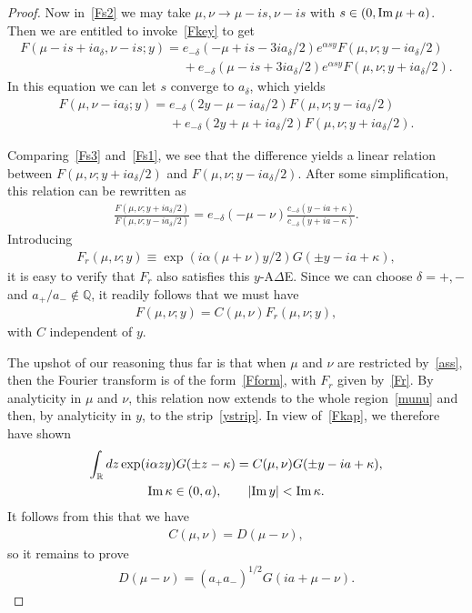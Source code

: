 \documentclass[11pt]{article}
\numberwithin{equation}{section}
\newcommand{\De}{\Delta}
\newcommand{\de}{\delta}
\newcommand{\R}{{\mathbb R}}
\newcommand{\Q}{{\mathbb Q}}
\newcommand{\im}{{\rm Im}\, }
\begin{document}
\begin{proof}
Now in~\eqref{Fs2} we may take $\mu,\nu\to \mu-is,\nu-is$ with $s\in(0,\im\mu +a)$. Then we are entitled to invoke~\eqref{Fkey} to get
\begin{gather}
F(\mu-is+ia_{\de},\nu-is;y)     =     e_{-\de}(-\mu+is-3ia_{\de}/2)e^{\alpha sy}F(\mu,\nu;y-ia_{\de}/2)
\nonumber \\
\phantom{F(\mu-is+ia_{\de},\nu-is;y)     =}{}   +e_{-\de}(\mu-is+3ia_{\de}/2)e^{\alpha sy}F(\mu,\nu;y+ia_{\de}/2).
\end{gather}
In this equation we can let $s$ converge to $a_{\de}$, which yields
\begin{gather}
F(\mu,\nu-ia_{\de};y)     =     e_{-\de}(2y-\mu-ia_{\de}/2)F(\mu,\nu;y-ia_{\de}/2)
\nonumber \\
\phantom{F(\mu,\nu-ia_{\de};y)     =}{}  +e_{-\de}(2y+\mu+ia_{\de}/2)F(\mu,\nu;y+ia_{\de}/2).\label{Fs3}
\end{gather}

Comparing~\eqref{Fs3} and~\eqref{Fs1}, we see that the dif\/ference yields a linear relation between $F(\mu,\nu;y+ia_{\de}/2)$ and $F(\mu,\nu;y-ia_{\de}/2)$. After some simplif\/ication, this relation can be rewritten as
\begin{gather}\label{Fade}
\frac{F(\mu,\nu;y+ia_{\de}/2)}{F(\mu,\nu;y-ia_{\de}/2)}=e_{-\de}(-\mu-\nu)\frac{c_{-\de}(y-ia+\kappa)}{c_{-\de}(y+ia-\kappa)}.
\end{gather}
Introducing
\begin{gather}\label{Fr}
F_r(\mu,\nu;y)\equiv \exp(i\alpha (\mu+\nu)y/2)G(\pm y-ia+\kappa),
\end{gather}
it is easy to verify that $F_r$ also satisf\/ies this $y$-A$\De$E. Since we can choose $\de=+,-$ and $a_{+}/a_{-}\notin\Q$, it readily follows that we must have
\begin{gather}\label{Fform}
F(\mu,\nu;y)=C(\mu,\nu)F_r(\mu,\nu;y),
\end{gather}
with $C$ independent of $y$.

The upshot of our reasoning thus far is that when $\mu$ and $\nu$ are restricted by~\eqref{ass}, then the Fourier transform is of the form~\eqref{Fform}, with $F_r$ given by~\eqref{Fr}. By analyticity in $\mu$ and $\nu$, this relation now extends to the whole region~\eqref{munu} and then, by analyticity in $y$, to the strip~\eqref{ystrip}. In view of~\eqref{Fkap}, we therefore have shown
\begin{gather}
\int_{\R}dz\exp(i\alpha zy)G(\pm z-\kappa)=C(\mu,\nu)G(\pm y-ia+\kappa),\\
 \im \kappa \in (0,a),\qquad |\im y|<\im \kappa.\nonumber
\end{gather}
It follows from this that we have
\begin{gather}
C(\mu,\nu)=D(\mu-\nu),
\end{gather}
so it remains to prove
\begin{gather}
D(\mu-\nu)=(a_{+}a_{-})^{1/2} G(ia+\mu-\nu).
\end{gather}


\end{proof}
\end{document}
